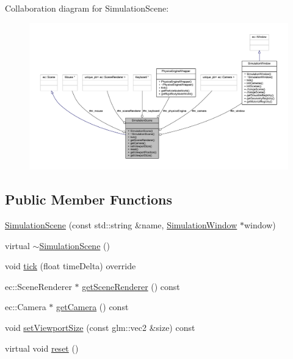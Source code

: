 Collaboration diagram for Simulation\+Scene\+:\nopagebreak
\begin{figure}[H]
\begin{center}
\leavevmode
\includegraphics[width=350pt]{class_simulation_scene__coll__graph}
\end{center}
\end{figure}
\subsection*{Public Member Functions}
\begin{DoxyCompactItemize}
\item 
\mbox{\hyperlink{class_simulation_scene_a6adc5bb46c9989e666076edcb4e8e2de}{Simulation\+Scene}} (const std\+::string \&name, \mbox{\hyperlink{class_simulation_window}{Simulation\+Window}} $\ast$window)
\item 
virtual \mbox{\hyperlink{class_simulation_scene_ab084c186d269ce4576b2dda25fc0fbd6}{$\sim$\+Simulation\+Scene}} ()
\item 
void \mbox{\hyperlink{class_simulation_scene_afa830118b974cf6e579876b71ea5fb19}{tick}} (float time\+Delta) override
\item 
ec\+::\+Scene\+Renderer $\ast$ \mbox{\hyperlink{class_simulation_scene_aebc710c8b75f155eaab35f11ca825d9c}{get\+Scene\+Renderer}} () const
\item 
ec\+::\+Camera $\ast$ \mbox{\hyperlink{class_simulation_scene_a755153bde36d77afa9ad69a300463c31}{get\+Camera}} () const
\item 
void \mbox{\hyperlink{class_simulation_scene_a1a671a6caac15d53c5fbc043a58d040b}{set\+Viewport\+Size}} (const glm\+::vec2 \&size) const
\item 
virtual void \mbox{\hyperlink{class_simulation_scene_a32468fce8b00310b6e306bf558642913}{reset}} ()
\end{DoxyCompactItemize}
